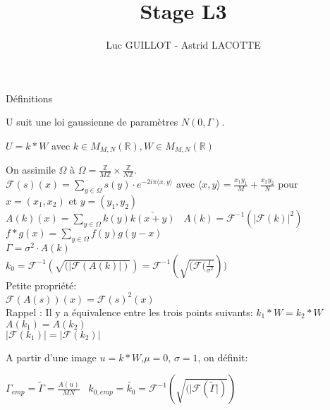 \documentclass{article} %
\title{\textbf{Stage L3}}
\author{Luc GUILLOT - Astrid LACOTTE}
\begin{document}
\maketitle


\begin{section}{Définitions}

U suit une loi gaussienne de paramètres $N(0, \Gamma)$.

$U = k \ast W$ avec $k \in M_{M,N}(\mathbb{R}), W \in M_{M,N}(\mathbb{R})$


On assimile $\Omega$ à $\Omega = \frac{\mathbb{Z}}{M\mathbb{Z}} \times \frac{\mathbb{Z}}{N\mathbb{Z}}$.
\\
$\mathcal{F}(s)(x) = \sum_{ y \in \Omega}{s(y) \cdot e^{-2i \pi \langle x,y \rangle}}$ avec 
$\langle x,y \rangle =  \frac{ x_1 y_1}{M} + \frac{ x_2 y_2}{N}$ pour $x = (x_1,x_2)$ et $y = (y_1,y_2)$
\\
$A(k)(x) = \sum_{ y \in \Omega}{k(y)\bar{k(x+y)}}$ \
$A(k) = \mathcal{F}^{-1}( {\lvert \mathcal{F}(k) \rvert }^2)$
\\
$f \ast g (x) = \sum_{ y \in \Omega}{f(y)g(y-x)}$
\\
$\Gamma = \sigma^{2} \cdot A(k) $
\\
$k_0 = \mathcal{F}^{-1}( \sqrt{(\lvert \mathcal{F}(A(k) \rvert) }) = \mathcal{F}^{-1}( \sqrt{( \mathcal{F}(\frac{\Gamma}{\sigma^2}  }))$
\\
Petite propriété:
\\
$\mathcal{F}(A(s))(x) = \mathcal{F}(s)^2(x)$ 
\\
Rappel : Il y a équivalence entre les trois points suivants:
$k_1 \ast W = k_2 \ast W$
\\
$A(k_1) = A(k_2)$
\\
$\lvert \mathcal{F}(k_1) \rvert = \lvert \mathcal{F}(k_2) \rvert$

A partir d'une image $u = k \ast W$,$\mu = 0$, $\sigma = 1$, on définit:

$\Gamma_{emp} = \tilde{\Gamma} = \frac{A(u)}{MN}$ \
$k_{0,emp} = \tilde{k_0}= \mathcal{F}^{-1}( \sqrt{(\lvert \mathcal{F}(\tilde{\Gamma} \rvert) })$



\end{section}
\end{document}

